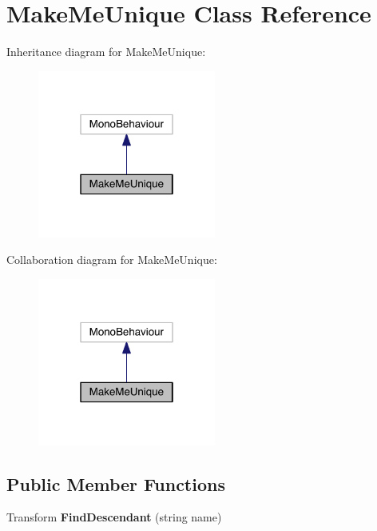 \hypertarget{class_make_me_unique}{}\section{Make\+Me\+Unique Class Reference}
\label{class_make_me_unique}


Inheritance diagram for Make\+Me\+Unique\+:\nopagebreak
\begin{figure}[H]
\begin{center}
\leavevmode
\includegraphics[width=166pt]{class_make_me_unique__inherit__graph}
\end{center}
\end{figure}


Collaboration diagram for Make\+Me\+Unique\+:\nopagebreak
\begin{figure}[H]
\begin{center}
\leavevmode
\includegraphics[width=166pt]{class_make_me_unique__coll__graph}
\end{center}
\end{figure}
\subsection*{Public Member Functions}
\begin{DoxyCompactItemize}
\item 
Transform {\bfseries Find\+Descendant} (string name)\hypertarget{class_make_me_unique_afb478e99509d81276cc729c95767f006}{}\label{class_make_me_unique_afb478e99509d81276cc729c95767f006}

\end{DoxyCompactItemize}
